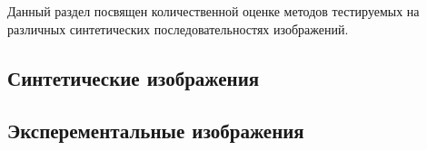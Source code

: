 Данный раздел посвящен количественной оценке методов тестируемых на различных синтетических последовательностях изображений.
\subsection{Синтетические изображения}

\subsection{Эксперементальные изображения}
